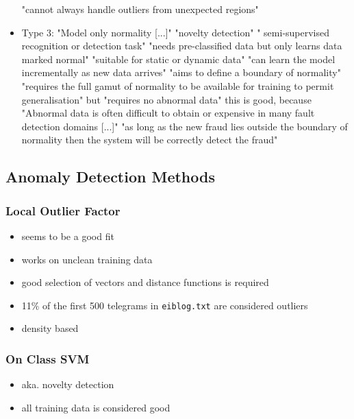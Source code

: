 \begin{itemize}
		\subitem "cannot always handle outliers from unexpected regions" \parencite{Hodge2004}
		\item Type 3: "Model only normality [...]" \parencite{Hodge2004}
		\subitem "novelty detection" \parencite{Hodge2004} " semi-supervised recognition or detection task" \parencite{Hodge2004}
		\subitem "needs pre-classified data but only learns data marked normal" \parencite{Hodge2004}
		\subitem "suitable for static or dynamic data" \parencite{Hodge2004}
		\subitem "can learn the model incrementally as new data arrives" \parencite{Hodge2004}
		\subitem "aims to define a boundary of normality" \parencite{Hodge2004}
		\subitem "requires the full gamut of normality to be available for training to permit generalisation" \parencite{Hodge2004} but "requires no abnormal data" \parencite{Hodge2004}
		\subitem this is good, because "Abnormal data is often difficult to obtain or expensive in many fault detection domains [...]" \parencite{Hodge2004}
		\subitem "as long as the new fraud lies outside the boundary of normality then the system will be correctly detect the fraud" \parencite{Hodge2004}
		
	\end{itemize}
	
	\subsection{Anomaly Detection Methods}
	
	\subsubsection{Local Outlier Factor}
	\begin{itemize}
		\item seems to be a good fit
		\item works on unclean training data
		\item good selection of vectors and distance functions is required
		\item 11\% of the first 500 telegrams in \verb|eiblog.txt| are considered outliers
		\item density based
	\end{itemize}
	
	\subsubsection{On Class SVM}
	\begin{itemize}
		\item aka. novelty detection
		\item all training data is considered good
	\end{itemize}
	
